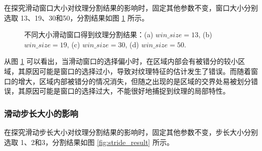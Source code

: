 在探究滑动窗口大小对纹理分割结果的影响时，固定其他参数不变，窗口大小分别选取 13、19、30和50，分割结果如图 \ref{fig:winsize_result} 所示。


\begin{figure}[!ht]
	\vspace{-0.8cm}
  \centering
  \begin{minipage}[b]{\linewidth} 	

  \end{minipage}
  \vfill
  \caption{不同大小滑动窗口得到纹理分割结果：(a) $win\_size=13$, (b) $win\_size=19$, (c) $win\_size=30$, (d) $win\_size=50$.}
  \label{fig:winsize_result}
\end{figure}

从图 \ref{fig:winsize_result} 可以看出，当滑动窗口的选择偏小时，在区域内部会有被错分的较小区域，其原因可能是窗口的选择过小，导致对纹理特征的估计发生了错误。而随着窗口的增大，区域内部被错分的情况消失，但随之出现的是区域的交界处易被划分错误，其原因可能是窗口的选择过大，不能很好地捕捉到纹理的局部特性。

\subsubsection{滑动步长大小的影响}

在探究滑动步长大小对纹理分割结果的影响时，固定其他参数不变，步长大小分别选取 1、2和3，分割结果如图 \ref{fig:stride_result} 所示。

